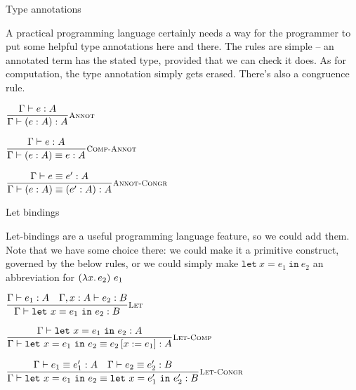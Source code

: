 \documentclass{beamer}
\begin{document}
\begin{frame}{Type annotations}

A practical programming language certainly needs a way for the programmer to put some helpful type annotations here and there. The rules are simple -- an annotated term has the stated type, provided that we can check it does. As for computation, the type annotation simply gets erased. There's also a congruence rule.

\vspace{1em}

\begin{center}
  $\infrule[Annot]{\typing{e}{A}}{\typing{\annot{e}{A}}{A}}$

  \vspace{1em}

  $\infrule[Comp-Annot]{\typing{e}{A}}{\compeq{\annot{e}{A}}{e}{A}}$

  \vspace{1em}

  $\infrule[Annot-Congr]{\compeq{e}{e'}{A}}{\compeq{\annot{e}{A}}{\annot{e'}{A}}{A}}$
\end{center}

\end{frame}

\newcommand{\letin}[3]{\texttt{let}\ #1 = #2\ \texttt{in}\ #3}

\begin{frame}{Let bindings}

Let-bindings are a useful programming language feature, so we could add them. Note that we have some choice there: we could make it a primitive construct, governed by the below rules, or we could simply make $\letin{x}{e_1}{e_2}$ an abbreviation for $\app{(\fun{x}{e_2})}{e_1}$

\vspace{1em}

\begin{center}
  $\infrule[Let]{\typing{e_1}{A} \quad \typing[\extend{\Gamma}{x}{A}]{e_2}{B}}{\typing{\letin{x}{e_1}{e_2}}{B}}$

  \vspace{2em}

  $\infrule[Let-Comp]{\typing{\letin{x}{e_1}{e_2}}{A}}{\compeq{\letin{x}{e_1}{e_2}}{\subst{e_2}{x}{e_1}}{A}}$

  \vspace{2em}

  $\infrule[Let-Congr]{\compeq{e_1}{e_1'}{A} \quad \compeq{e_2}{e_2'}{B}}{\compeq{\letin{x}{e_1}{e_2}}{\letin{x}{e_1'}{e_2'}}{B}}$
\end{center}

\end{frame}
\end{document}
